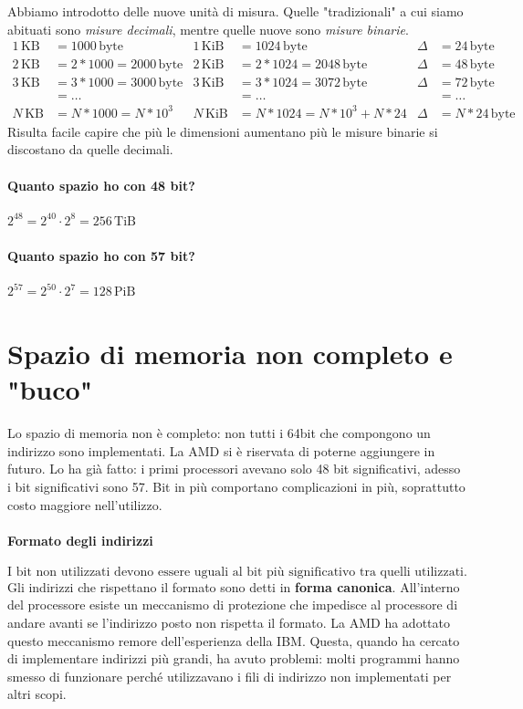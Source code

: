 \noindent Abbiamo introdotto delle nuove unità di misura. Quelle "tradizionali" a cui siamo abituati sono \emph{misure decimali}, mentre quelle nuove sono \emph{misure binarie}. 
\begin{align*} 
	1\,\text{KB}&=1000\,\text{byte}&1\,\text{KiB}&=1024\,\text{byte}&\Delta&=24\,\text{byte}\\
	2\,\text{KB}&=2*1000=2000\,\text{byte}&2\,\text{KiB}&=2*1024=2048\,\text{byte}&\Delta&=48\,\text{byte}\\
	3\,\text{KB}&=3*1000=3000\,\text{byte}&3\,\text{KiB}&=3*1024=3072\,\text{byte}&\Delta&=72\,\text{byte}\\
	&=\dots&&=\dots&&=\dots\\
	N\,\text{KB}&=N*1000=N*{10}^3&N\,\text{KiB}&=N*1024=N*{10}^3+N*24&\Delta&=N*24\,\text{byte}
\end{align*}
Risulta facile capire che più le dimensioni aumentano più le misure binarie si discostano da quelle decimali.

\paragraph{Quanto spazio ho con 48 bit?} $2^{48}=2^{40} \cdot 2^{8}= 256\,\text{TiB}$
\paragraph{Quanto spazio ho con 57 bit?} $2^{57}=2^{50} \cdot 2^{7}= 128\,\text{PiB}$

\section{Spazio di memoria non completo e "buco"} Lo spazio di memoria non è completo: non tutti i 64bit che compongono un indirizzo sono implementati. La AMD si è riservata di poterne aggiungere in futuro. Lo ha già fatto: i primi processori avevano solo 48 bit significativi, adesso i bit significativi sono 57. Bit in più comportano complicazioni in più, soprattutto costo maggiore nell'utilizzo.
\paragraph{Formato degli indirizzi} \[\boxed{\text{I bit non utilizzati devono essere uguali al bit più significativo tra quelli utilizzati.}}\]Gli indirizzi che rispettano il formato sono detti in \textbf{forma canonica}. All'interno del processore esiste un meccanismo di protezione che impedisce al processore di andare avanti se l'indirizzo posto non rispetta il formato. La AMD ha adottato questo meccanismo remore dell'esperienza della IBM. Questa, quando ha cercato di implementare indirizzi più grandi, ha avuto problemi: molti programmi hanno smesso di funzionare perché utilizzavano i fili di indirizzo non implementati per altri scopi.

